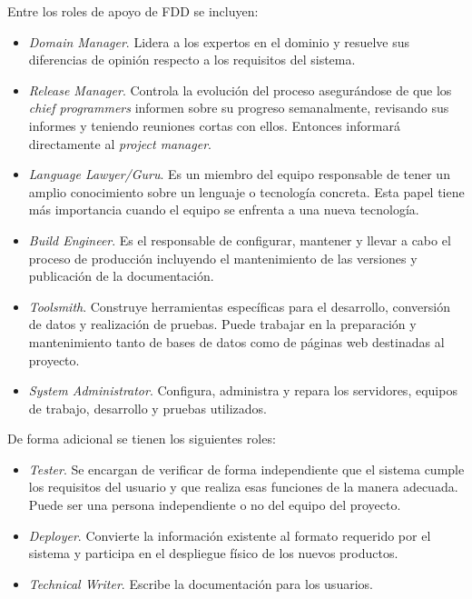 \documentclass[11pt]{article}
\begin{document}
Entre los roles de apoyo de FDD se incluyen:

\begin{itemize}
\item \textit{Domain Manager}. Lidera a los expertos en el dominio y resuelve sus diferencias de opinión respecto a los requisitos del sistema.
\item \textit{Release Manager}. Controla la evolución del proceso asegurándose de que los \textit{chief programmers} informen sobre su progreso semanalmente, revisando sus informes y teniendo reuniones cortas con ellos. Entonces informará directamente al \textit{project manager}.
\item \textit{Language Lawyer/Guru}. Es un miembro del equipo responsable de tener un amplio conocimiento sobre un lenguaje o tecnología concreta. Esta papel tiene más importancia cuando el equipo se enfrenta a una nueva tecnología.
\item \textit{Build Engineer}. Es el responsable de configurar, mantener y llevar a cabo el proceso de producción incluyendo el mantenimiento de las versiones y publicación de la documentación.
\item \textit{Toolsmith}. Construye herramientas específicas para el desarrollo, conversión de datos y realización de pruebas. Puede trabajar en la preparación y mantenimiento tanto de bases de datos como de páginas web destinadas al proyecto.
\item \textit{System Administrator}. Configura, administra y repara los servidores, equipos de trabajo, desarrollo y pruebas utilizados. 
\end{itemize}

De forma adicional se tienen los siguientes roles:

\begin{itemize}
\item \textit{Tester}. Se encargan de verificar de forma independiente que el sistema cumple los requisitos del usuario y que realiza esas funciones de la manera adecuada. Puede ser una persona independiente o no del equipo del proyecto.
\item \textit{Deployer}. Convierte la información existente al formato requerido por el sistema y participa en el despliegue físico de los nuevos productos. 
\item \textit{Technical Writer}. Escribe la documentación para los usuarios.

\end{itemize}
\end{document}
